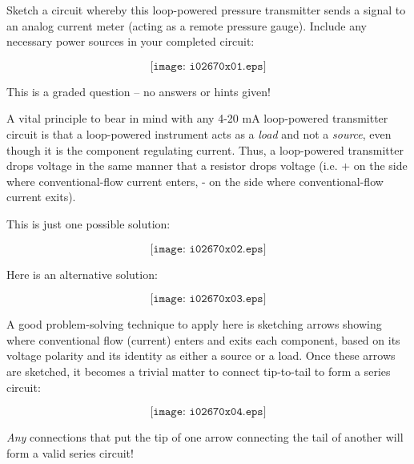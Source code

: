 

Sketch a circuit whereby this loop-powered pressure transmitter sends a signal to an analog current meter (acting as a remote pressure gauge).  Include any necessary power sources in your completed circuit:

\vskip 50pt

$$\texttt{[image: i02670x01.eps]}$$

\vfil 

\eject






This is a graded question -- no answers or hints given!







A vital principle to bear in mind with any 4-20 mA loop-powered transmitter circuit is that a loop-powered instrument acts as a {\it load} and not a {\it source}, even though it is the component regulating current.  Thus, a loop-powered transmitter drops voltage in the same manner that a resistor drops voltage (i.e. + on the side where conventional-flow current enters, - on the side where conventional-flow current exits).

\vskip 10pt

This is just one possible solution:

$$\texttt{[image: i02670x02.eps]}$$

\vskip 10pt

Here is an alternative solution:

$$\texttt{[image: i02670x03.eps]}$$

\filbreak

A good problem-solving technique to apply here is sketching arrows showing where conventional flow (current) enters and exits each component, based on its voltage polarity and its identity as either a source or a load.  Once these arrows are sketched, it becomes a trivial matter to connect tip-to-tail to form a series circuit:

$$\texttt{[image: i02670x04.eps]}$$

{\it Any} connections that put the tip of one arrow connecting the tail of another will form a valid series circuit!






